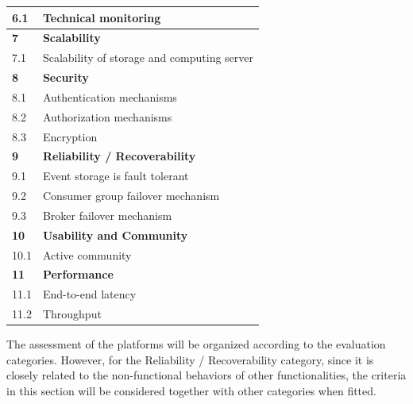 \begin{table}[h]
\begin{tabular}{|l|l|}
		6.1          & Technical monitoring                                     \\ \hline
		\textbf{7}   & \textbf{Scalability}                                     \\ \hline
		7.1          & Scalability of storage and computing server              \\ \hline
		\textbf{8}   & \textbf{Security}                                        \\ \hline
		8.1          & Authentication mechanisms                                \\ \hline
		8.2          & Authorization mechanisms                                 \\ \hline
		8.3          & Encryption                                               \\ \hline
		\textbf{9}  & \textbf{Reliability / Recoverability}                    \\ \hline
		9.1         & Event storage is fault tolerant                          \\ \hline
		9.2         & Consumer group failover mechanism                        \\ \hline
		9.3         & Broker failover mechanism                                \\ \hline
		\textbf{10}  & \textbf{Usability and Community}                         \\ \hline
		10.1         & Active community                                       \\   \hline
		\textbf{11}  & \textbf{Performance}                                     \\ \hline
		11.1         & End-to-end latency                                       \\ \hline
		11.2         & Throughput                                               \\ \hline
	\end{tabular}
\end{table}

The assessment of the platforms will be organized according to the evaluation categories. However, for the Reliability / Recoverability category, since it is closely related to the non-functional behaviors of other functionalities, the criteria in this section will be considered together with other categories when fitted.




